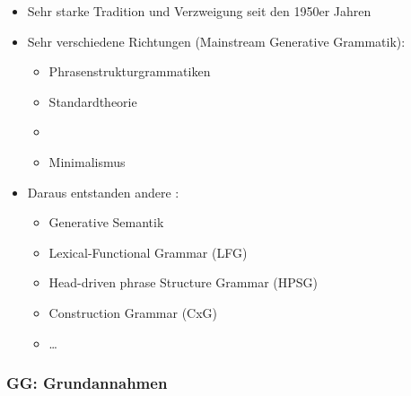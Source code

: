 \begin{frame}

\begin{itemize}
	\item Sehr starke Tradition und Verzweigung seit den 1950er Jahren
	
	\medskip

\settowidth{}	
	\item Sehr verschiedene Richtungen (Mainstream Generative Grammatik):
	\begin{itemize}
		\item Phrasenstrukturgrammatiken 
		\item Standardtheorie 
		\item {} 
		\item Minimalismus 
	\end{itemize}

\medskip

	\item Daraus entstanden andere :
	
	\begin{itemize}
		\item Generative Semantik 
		\item Lexical-Functional Grammar (LFG) 
		\item Head-driven phrase Structure Grammar (HPSG) 
		
		
		\item Construction Grammar (CxG) 
		\item \dots
	\end{itemize}
\end{itemize}

\citep[vgl.][]{MuellerS15b, Kertész&Co19}

\end{frame}


\subsubsection{GG: Grundannahmen}

